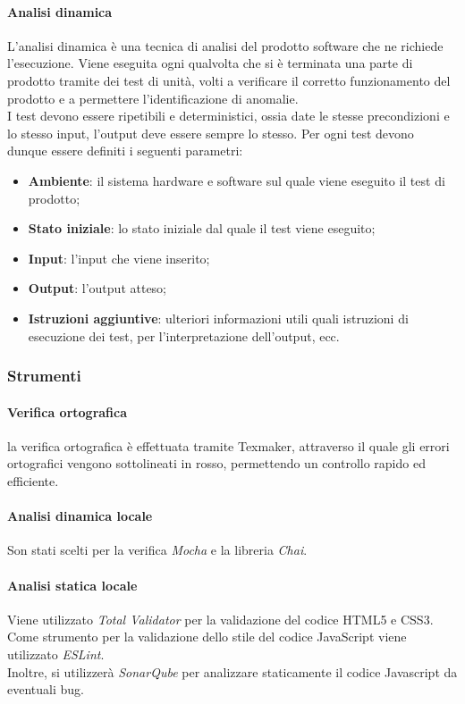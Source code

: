 \documentclass[11pt,a4paper]{article}
\begin{document}
{	\paragraph{Analisi dinamica\\}
	L'analisi dinamica è una tecnica di analisi del prodotto software che ne richiede l'esecuzione. Viene eseguita ogni qualvolta che si è terminata una parte di prodotto tramite dei test di unità, volti a verificare il corretto funzionamento del prodotto e a permettere l'identificazione di anomalie. \\
	I test devono essere ripetibili e deterministici, ossia date le stesse precondizioni e lo stesso input, l'output deve essere sempre lo stesso. Per ogni test devono dunque essere definiti i seguenti parametri:
	\begin{itemize}
		\item \textbf{Ambiente}: il sistema hardware e software sul quale viene eseguito il test di prodotto;
		\item \textbf{Stato iniziale}: lo stato iniziale dal quale il test viene eseguito;
		\item \textbf{Input}: l'input che viene inserito;
		\item \textbf{Output}: l'output atteso;
		\item \textbf{Istruzioni aggiuntive}: ulteriori informazioni utili quali istruzioni di esecuzione dei test, per l'interpretazione dell'output, ecc. 
	\end{itemize}
		
	\subsubsection{Strumenti}	
	\paragraph{Verifica ortografica\\}
	la verifica ortografica è effettuata tramite Texmaker, attraverso il quale gli errori ortografici vengono sottolineati in rosso, permettendo un controllo rapido ed efficiente.
	\paragraph{Analisi dinamica locale\\}
	Son stati scelti per la verifica \textit{Mocha} e la libreria \textit{Chai}. 
	\paragraph{Analisi statica locale\\}
	Viene utilizzato \textit{Total Validator} per la validazione del codice HTML5 e CSS3. \\
	Come strumento per la validazione dello stile del codice JavaScript viene utilizzato \textit{ESLint}. \\
	Inoltre, si utilizzerà \textit{SonarQube} per analizzare staticamente il codice Javascript da eventuali bug.
	
}
\end{document}
